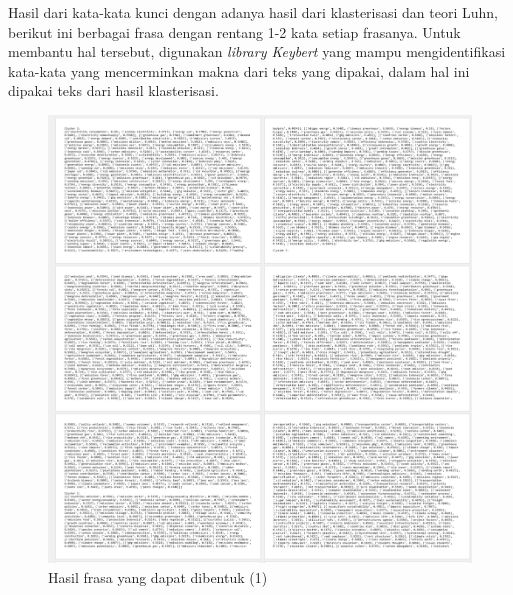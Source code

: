 \label{lampiran2}

Hasil dari kata-kata kunci dengan adanya hasil dari klasterisasi dan teori Luhn, berikut ini berbagai frasa dengan rentang 1-2 kata setiap frasanya. Untuk membantu hal tersebut, digunakan \textit{library Keybert} yang mampu mengidentifikasi kata-kata yang mencerminkan makna dari teks yang dipakai, dalam hal ini dipakai teks dari hasil klasterisasi. 
\begin{figure}[H]
    \centering
    \includegraphics[width=\linewidth]{img/L2-1.png}
    \caption{Hasil frasa yang dapat dibentuk (1)}
    \label{fig:L2-1}
\end{figure}
